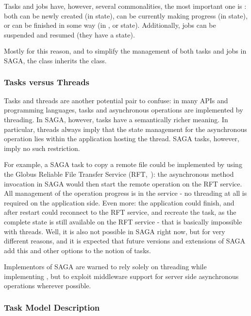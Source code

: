    Tasks and jobs have, however, several commonalities,
   the most important one is : both can be newly
   created (in  state), can be currently making progress
   (in  state), or can be finished in some way (in
   ,  or  state).  Additionally,
   jobs can be suspended and resumed (they have a 
   state).
  
   Mostly for this reason, and to simplify the
   management of both tasks and jobs in SAGA, the 
   class inherits the  class.
 
  \subsubsection*{Tasks versus Threads}
 
   Tasks and threads are another potential pair to
   confuse: in many APIs and programming languages, tasks and
   asynchronous operations are implemented by threading.  In
   SAGA, however, tasks have a semantically richer meaning.  In
   particular, threads always imply that the state management
   for the asynchronous operation lies within the application
   hosting the thread.  SAGA tasks, however, imply no such
   restriction.
   
   For example, a SAGA task to copy a remote file
   could be implemented by using the Globus Reliable File
   Transfer Service (RFT,~\cite{rft}): the asynchronous method
   invocation in SAGA would then start the remote operation on
   the RFT service.  All management of the operation progress is
   in the service - no threading at all is required on the
   application side.  Even more: the application could finish,
   and after restart could reconnect to the RFT service, and
   recreate the task, as the complete state is still available
   on the RFT service - that is basically impossible with
   threads.  Well, it is also not possible in SAGA right now,
   but for very different reasons, and it is expected that
   future versions and extensions of SAGA add this and other
   options to the notion of tasks.
 
   Implementors of SAGA are warned  to rely
   solely on threading while implementing , but to
   exploit middleware support for server side asynchronous
   operations wherever possible.
 
 
  \subsubsection*{Task Model Description}
 
